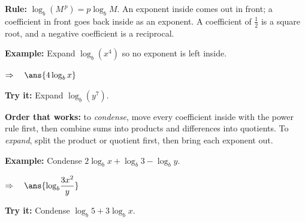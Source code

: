 \documentclass[12pt]{article}
\begin{document}

\begin{formulabox}
\textbf{Rule:} $\log_b\!\left(M^{\,p}\right) = p\log_b M$. An exponent inside
comes out in front; a coefficient in front goes back inside as an exponent. A
coefficient of $\tfrac12$ is a square root, and a negative coefficient is a
reciprocal.
\end{formulabox}

\begin{examplebox}
\textbf{Example:} \quad Expand $\log_b\!\left(x^4\right)$ so no exponent is left
inside.

$\Rightarrow\quad \ans{4\log_b x}$
\end{examplebox}

\begin{tryitbox}
\textbf{Try it:} \quad Expand $\log_b\!\left(y^7\right)$.\\[2pt]
\end{tryitbox}


\begin{formulabox}
\textbf{Order that works:} to \emph{condense}, move every coefficient inside with
the power rule first, then combine sums into products and differences into
quotients. To \emph{expand}, split the product or quotient first, then bring each
exponent out.
\end{formulabox}

\begin{examplebox}
\textbf{Example:} \quad Condense $2\log_b x + \log_b 3 - \log_b y$.

$\Rightarrow\quad \ans{\log_b\!\dfrac{3x^2}{y}}$
\end{examplebox}

\begin{tryitbox}
\textbf{Try it:} \quad Condense $\log_b 5 + 3\log_b x$.\\[2pt]
\end{tryitbox}
\end{document}

